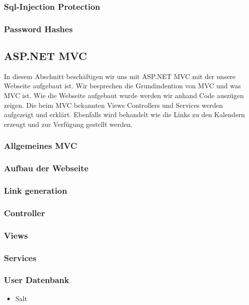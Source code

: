 \subsubsection{Sql-Injection Protection}
\label{sec:sqli}
\subsubsection{Password Hashes}
\label{sec:hash}
\subsection{ASP.NET MVC}
In diesem Abschnitt beschäftigen wir uns mit ASP.NET MVC mit der unsere Webseite aufgebaut ist. Wir besprechen die Grundindention von MVC und was MVC ist. Wie die Webseite aufgebaut wurde werden wir anhand Code auszügen zeigen. Die beim MVC bekannten Views Controllers und Services werden aufgezeigt und erklärt. Ebenfalls wird behandelt wie die Links zu den Kalendern erzeugt und zur Verfügung gestellt werden. 
\label{sec:MVC}
\subsubsection{Allgemeines MVC}
\label{sec:allgemein}

\subsubsection{Aufbau der Webseite }
\label{sec:aufbau}
\subsubsection{Link generation}
\label{sec:link}
\subsubsection{Controller}
\label{sec:Controller}
\subsubsection{Views}
\label{sec:Views}
\subsubsection{Services}
\label{sec:Services}
\subsubsection{User Datenbank}
\label{sec:UserDB}
\begin{itemize}
	\item Salt
\end{itemize}
\label{sec:salt}
